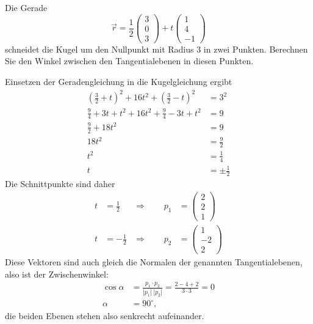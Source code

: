 Die Gerade
\[
\vec r
=
\frac12\begin{pmatrix}3\\0\\3\end{pmatrix}
+t
\begin{pmatrix}1\\4\\-1\end{pmatrix}
\]
schneidet die Kugel um den Nullpunkt mit Radius $3$ in zwei Punkten.
Berechnen Sie den Winkel zwischen den Tangentialebenen in diesen
Punkten.

\begin{loesung}
Einsetzen der Geradengleichung in die Kugelgleichung ergibt
\begin{align*}
(\frac32+t)^2 + 16t^2 + (\frac32 - t)^2&=3^2\\
\frac94+3t+t^2+16t^2+\frac94-3t+t^2&=9\\
\frac92+18t^2&=9\\
18t^2&=\frac92\\
t^2&=\frac14\\
t&=\pm\frac12
\end{align*}
Die Schnittpunkte sind daher
\begin{align*}
t&=\frac12&\Rightarrow\qquad p_1&=\begin{pmatrix}2\\2\\1\end{pmatrix}\\
t&=-\frac12&\Rightarrow\qquad p_2&=\begin{pmatrix}1\\-2\\2\end{pmatrix}
\end{align*}
Diese Vektoren sind auch gleich die Normalen der genannten Tangentialebenen,
also ist der Zwischenwinkel:
\begin{align*}
\cos\alpha&=\frac{p_1\cdot p_2}{|p_1|\;|p_2|} =\frac{2-4+2}{3\cdot 3}=0
\\
\alpha&=90^\circ,
\end{align*}
die beiden Ebenen stehen also senkrecht aufeinander.
\end{loesung}


